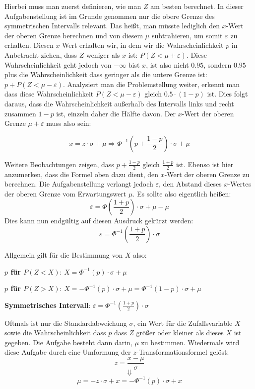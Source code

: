 Hierbei muss man zuerst definieren, wie man $Z$ am besten berechnet. In dieser Aufgabenstellung ist im Grunde genommen nur die obere Grenze des symmetrischen Intervalls relevant. Das hei\ss{}t, man m\"{u}sste lediglich den $x$-Wert der oberen Grenze berechnen und von diesem $\mu$ subtrahieren, um somit $\varepsilon$ zu erhalten. Diesen $x$-Wert erhalten wir, in dem wir die Wahrscheinlichkeit $p$ in Anbetracht ziehen, dass $Z$ weniger als $x$ ist: $P(Z < \mu + \varepsilon)$. Diese Wahrscheinlichkeit geht jedoch von $-\infty$ bist $x$, ist also nicht $0.95$, sondern $0.95$ plus die Wahrscheinlichkeit dass geringer als die untere Grenze ist: $p + P(Z < \mu - \varepsilon)$. Analysiert man die Problemstellung weiter, erkennt man dass diese Wahrscheinlichkeit $P(Z < \mu - \varepsilon)$ gleich $0.5 \cdot (1 - p)$ ist. Dies folgt daraus, dass die Wahrscheinlichkeit au\ss{}erhalb des Intervalls links und recht zusammen $1 - p$ ist, einzeln daher die H\"{a}lfte davon. Der $x$-Wert der oberen Grenze $\mu + \varepsilon$ muss also sein: 

$$x = z \cdot \sigma + \mu \Rightarrow \Phi^{-1}\left(p + \frac{1 -p}{2}\right) \cdot \sigma + \mu$$ 

\pagebreak

Weitere Beobachtungen zeigen, dass $p + \frac{1 - p}{2}$ gleich $\frac{1 + p}{2}$ ist. Ebenso ist hier anzumerken, dass die Formel oben dazu dient, den $x$-Wert der oberen Grenze zu berechnen. Die Aufgabenstellung verlangt jedoch $\varepsilon$, den Abstand dieses $x$-Wertes der oberen Grenze vom Erwartungswert $\mu$. Es sollte also eigentlich hei\ss{}en: $$\varepsilon = \Phi\left(\frac{1 + p}{2}\right) \cdot \sigma + \mu - \mu$$ Dies kann nun endg\"{u}ltig auf diesen Ausdruck gek\"{u}rzt werden: $$\varepsilon = \Phi^{-1}\left(\frac{1 + p}{2}\right) \cdot \sigma$$

Allgemein gilt f\"{u}r die Bestimmung von $X$ also:

\textbf{$p$ f\"{u}r $P(Z < X)$}: $X = \Phi^{-1}(p) \cdot \sigma + \mu$

\textbf{$p$ f\"{u}r $P(Z > X)$}: $X = -\Phi^{-1}(p) \cdot \sigma + \mu = \Phi^{-1}(1 - p) \cdot \sigma + \mu$

\textbf{Symmetrisches Intervall}: $\varepsilon = \Phi^{-1}\left(\frac{1 + p}{2}\right) \cdot \sigma$


Oftmals ist nur die Standardabweichung $\sigma$, ein Wert f\"{u}r die Zufallsvariable $X$ sowie die Wahrscheinlichkeit dass $p$ dass $Z$ gr\"{o}\ss{}er oder kleiner als dieses $X$ ist gegeben. Die Aufgabe besteht dann darin, $\mu$ zu bestimmen. Wiedermals wird diese Aufgabe durch eine Umformung der $z$-Transformationsformel gel\"{o}st: $$z = \frac{x - \mu}{\sigma}$$ $$\Downarrow$$ $$\mu = -z \cdot \sigma + x = -\Phi^{-1}(p) \cdot \sigma + x$$

